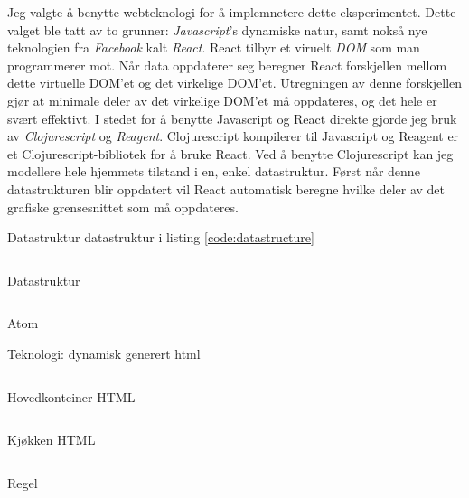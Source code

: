Jeg valgte å benytte webteknologi for å implemnetere dette eksperimentet. Dette valget ble tatt av to grunner: \emph{Javascript}'s dynamiske natur, samt nokså nye teknologien fra \emph{Facebook} kalt \emph{React}. React tilbyr et viruelt \emph{DOM} som man programmerer mot. Når data oppdaterer seg beregner React forskjellen mellom dette virtuelle DOM'et og det virkelige DOM'et. Utregningen av denne forskjellen gjør at minimale deler av det virkelige DOM'et må oppdateres, og det hele er svært effektivt. I stedet for å benytte Javascript og React direkte gjorde jeg bruk av \emph{Clojurescript} og \emph{Reagent}. Clojurescript kompilerer til Javascript og Reagent er et Clojurescript-bibliotek for å bruke React. Ved å benytte Clojurescript kan jeg modellere hele hjemmets tilstand i en, enkel datastruktur. Først når denne datastrukturen blir oppdatert vil React automatisk beregne hvilke deler av det grafiske grensesnittet som må oppdateres.

{\color{red}Datastruktur}
datastruktur i listing \ref{code:datastructure}

\begin{listing}[ht]
\inputminted[fontsize=\footnotesize, linenos]{clj}{kodesnutter/data.clj}
\caption{Datastruktur}
\label{code:datastructure}
\end{listing}

\begin{listing}[ht]
\inputminted[fontsize=\footnotesize, linenos]{clj}{kodesnutter/atom.clj}
\caption{Atom}
\label{code:atom}
\end{listing}

{\color{red}Teknologi: dynamisk generert html}

\begin{listing}[ht]
\inputminted[fontsize=\footnotesize, linenos]{clj}{kodesnutter/home.clj}
\caption{Hovedkonteiner HTML}
\label{code:home}
\end{listing}

\begin{listing}[ht]
\inputminted[fontsize=\footnotesize, linenos]{clj}{kodesnutter/kitchen.clj}
\caption{Kjøkken HTML}
\label{code:kitchen}
\end{listing}

\begin{listing}[ht]
\inputminted[fontsize=\footnotesize, linenos]{clj}{kodesnutter/rule.clj}
\caption{Regel}
\label{code:regel}
\end{listing}








